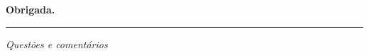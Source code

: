 \documentclass[aspectratio=169]{beamer}
\begin{document}
\begin{frame}[plain]
  \vspace*{3cm}
  \begin{center}
    \Huge\bfseries\textcolor{TextEspresso}{Obrigada.}\par
    \vspace{0.5cm}
    {\color{NudeTaupe}\rule{2cm}{0.5pt}}\par
    \vspace{0.5cm}
    \Large\textcolor{TextEspresso}{\itshape Questões e comentários}
  \end{center}
\end{frame}
\end{document}
